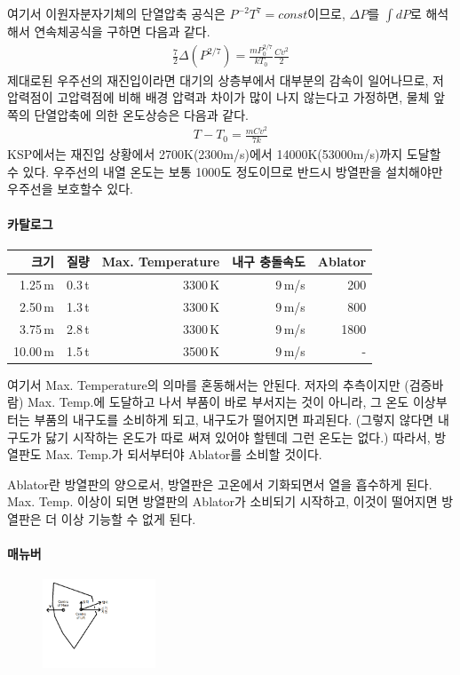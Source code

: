 \documentclass[9pt]{amsbook}
\begin{document}
여기서 이원자분자기체의 단열압축 공식은 $P^{-2}T^7=const$이므로, $\Delta P$를 $\int dP$로 해석해서 연속체공식을 구하면 다음과 같다.
\begin{align}
	\frac{7}{2}\Delta(P^{2/7}) = \frac{mP_0^{2/7}}{kT_0} \frac{Cv^2}{2}
\end{align}
제대로된 우주선의 재진입이라면 대기의 상층부에서 대부분의 감속이 일어나므로, 저압력점이 고압력점에 비해 배경 압력과 차이가 많이 나지 않는다고 가정하면, 물체 앞쪽의 단열압축에 의한 온도상승은 다음과 같다.
\begin{align}
T-T_0 = \frac{mCv^2}{7k}
\end{align}
KSP에서는 재진입 상황에서 2700K(2300m/s)에서 14000K(53000m/s)까지 도달할 수 있다. 우주선의 내열 온도는 보통 1000도 정도이므로 반드시 방열판을 설치해야만 우주선을 보호할수 있다.

\paragraph{카탈로그}
\begin{tabular}{|r|r|r|r|r|}
\hline
크기&질량& Max. Temperature& 내구 충돌속도& Ablator
\\\hline
1.25\,m&0.3\,t& 3300\,K&9\,m/s&200
\\2.50\,m&1.3\,t&3300\,K&9\,m/s&800
\\3.75\,m&2.8\,t&3300\,K&9\,m/s&1800
\\10.00\,m&1.5\,t&3500\,K&9\,m/s&-
\end{tabular}

여기서 Max. Temperature의 의마를 혼동해서는 안된다. 저자의 추측이지만 (검증바람) Max. Temp.에 도달하고 나서 부품이 바로 부서지는 것이 아니라, 그 온도 이상부터는 부품의 내구도를 소비하게 되고, 내구도가 떨어지면 파괴된다. (그렇지 않다면 내구도가 닳기 시작하는 온도가 따로 써져 있어야 할텐데 그런 온도는 없다.) 따라서, 방열판도 Max. Temp.가 되서부터야 Ablator를 소비할 것이다.

Ablator란 방열판의 양으로서, 방열판은 고온에서 기화되면서 열을 흡수하게 된다. Max. Temp. 이상이 되면 방열판의 Ablator가 소비되기 시작하고, 이것이 떨어지면 방열판은 더 이상 기능할 수 없게 된다.
\paragraph{매뉴버}

\begin{figure}
\caption{}
\includegraphics[width=0.3\textwidth]{lift.png}
\end{figure}
\end{document}
